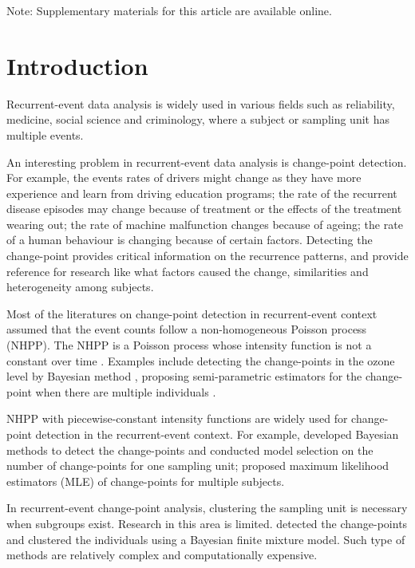 \documentclass[12pt]{article}
\begin{document}
Note: Supplementary materials for this article are available online.
\section{Introduction}

Recurrent-event data analysis is widely used in various fields such as reliability, medicine, social science and criminology, where a subject or sampling unit has multiple events. 

An interesting problem in recurrent-event data analysis is change-point detection. For example, the events rates of drivers might change as they have more experience and learn from driving education programs; the rate of the recurrent disease episodes may change because of treatment or the effects of the treatment wearing out; the rate of machine malfunction changes because of ageing; the rate of a human behaviour is changing because of certain factors. Detecting the change-point provides critical information on the recurrence patterns, and provide reference for research like what factors caused the change, similarities and heterogeneity among subjects.  

Most of the literatures on change-point detection in recurrent-event context assumed that the event counts follow a non-homogeneous Poisson process (NHPP). The NHPP is a Poisson process whose intensity function is not a constant over time \citep[p.~32]{Ross2006}. Examples include  detecting the change-points in the ozone level by Bayesian method \citep{Cruz2016}, proposing semi-parametric estimators for the change-point when there are multiple individuals \citep{Frobish2016}. 

NHPP with piecewise-constant intensity functions are widely used for change-point detection in the recurrent-event context. For example, \citet{Raftery1986,West1997, Aschar2007, Gupta2015, Montoya2017} developed Bayesian methods to detect the change-points and conducted model selection on the number of change-points for one sampling unit;  \citet{Frobish2009,Li2017b} proposed maximum likelihood estimators (MLE) of change-points for multiple subjects. 

In recurrent-event change-point analysis, clustering the sampling unit is necessary when subgroups exist. Research in this area is limited. \citet{Li2017a} detected the change-points and clustered the individuals using a Bayesian finite mixture model. Such type of methods are relatively complex and computationally expensive.
\end{document}
